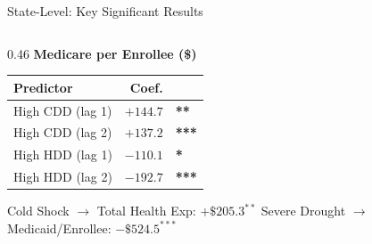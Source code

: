 \documentclass[aspectratio=169,11pt]{beamer}
\newcommand{\emphcolor}[1]{{\color{WarmOrange}\textbf{#1}}}
\newcommand{\tealtext}[1]{{\color{Teal}#1}}
\newcommand{\graytext}[1]{{\color{WarmGray}#1}}
\begin{document}
\begin{frame}{State-Level: Key Significant Results}
\begin{columns}[T]
\begin{column}{0.46\textwidth}
      \textbf{\tealtext{Medicare per Enrollee (\$)}}\\[0.3em]
      \begin{tabular}{lrl}
        \toprule
        Predictor & Coef. & \\
        \midrule
        High CDD (lag 1) & $+144.7$ & \emphcolor{**} \\
        High CDD (lag 2) & $+137.2$ & \emphcolor{***} \\
        High HDD (lag 1) & $-110.1$ & \emphcolor{*} \\
        High HDD (lag 2) & $-192.7$ & \emphcolor{***} \\
        \bottomrule
      \end{tabular}
      \vspace{0.3em}

      \graytext{\scriptsize Cold Shock $\to$ Total Health Exp: $+\$205.3^{**}$\quad
      Severe Drought $\to$ Medicaid/Enrollee: $-\$524.5^{***}$}
    \end{column}
  \end{columns}
\end{frame}
\end{document}
